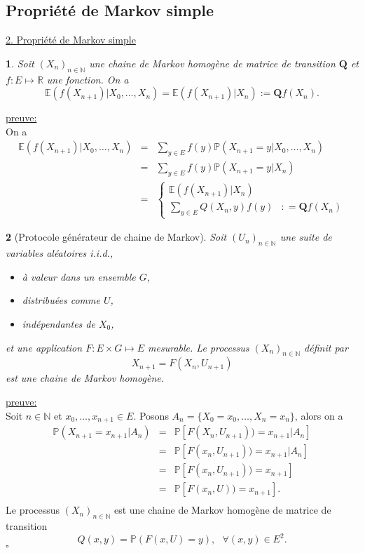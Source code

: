 \documentclass[8pt,notheorems]{beamer}
\def \E{\mathbb E}
\def \N{\mathbb N}
\def \P {\mathbb P}
\newtheorem{prop}{\translate{Proposition}}
\theoremstyle{definition}
\theoremstyle{example}
\theoremstyle{mystyle}
\theoremstyle{plain}
\begin{document}
 \subsection{Propriété de Markov simple}
 \begin{frame}[allowframebreaks]
 \underline{2. Propriété de Markov simple}
 \begin{prop}
 Soit $(X_n)_{n\in \N}$ une chaine de Markov homogène de matrice de transition $\mathbf{Q}$ et $f:E \mapsto \mathbb{R}$ une fonction. On a
 $$
 \E(f(X_{n+1})|X_{0},\ldots, X_n) = \E(f(X_{n+1})|X_n) := \mathbf{Q}f(X_n).
 $$
 \end{prop}
 \underline{preuve:}\\
 On a
 \begin{eqnarray*}
 \E(f(X_{n+1})|X_{0},\ldots, X_n) &=& \sum_{y\in E} f(y)\P(X_{n+1}=y|X_{0},\ldots, X_n)\\
 &=& \sum_{y\in E} f(y)\P(X_{n+1}=y| X_n) \\
 &=& \begin{cases}
 \E(f(X_{n+1})|X_n)&\\
 \sum_{y\in E} Q(X_n,y)f(y) & : = \mathbf{Q}f(X_n)
 \end{cases}
 \end{eqnarray*}
\begin{prop}[Protocole générateur de chaine de Markov]
Soit $(U_n)_{n\in\mathbb{N}}$ une suite de variables aléatoires i.i.d.,
\begin{itemize}
\item à valeur dans un ensemble $G$,
\item distribuées comme $U$,
\item indépendantes de $X_0$,
\end{itemize}
et une application $F:E\times G\mapsto E$ mesurable. Le processus $(X_n)_{n\in\mathbb{N}}$ définit par
$$
X_{n+1}=F(X_n,U_{n+1})
$$
est une chaine de Markov homogène.
\end{prop}
\underline{preuve:}\\
Soit $n\in\mathbb{N}$ et $x_0,\ldots,x_{n+1}\in E$. Posons $A_n=\{X_0=x_0,\ldots,X_n=x_n\}$, alors on a
\begin{eqnarray*}
\mathbb{P}(X_{n+1}=x_{n+1}|A_n)&=&\mathbb{P}[F(X_n,U_{n+1}))=x_{n+1}|A_n]\\
&=&\mathbb{P}[F(x_n,U_{n+1}))=x_{n+1}|A_n]\\
&=&\mathbb{P}[F(x_n,U_{n+1}))=x_{n+1}]\\
&=&\mathbb{P}[F(x_n,U))=x_{n+1}].\\
\end{eqnarray*}
Le processus $(X_n)_{n\in\mathbb{N}}$ est une chaine de Markov homogène de matrice de transition
$$
Q(x,y)=\mathbb{P}(F(x,U)=y),\text{ }\forall (x,y)\in E^{2}.
$$
$\square$
 \end{frame}
\end{document}
